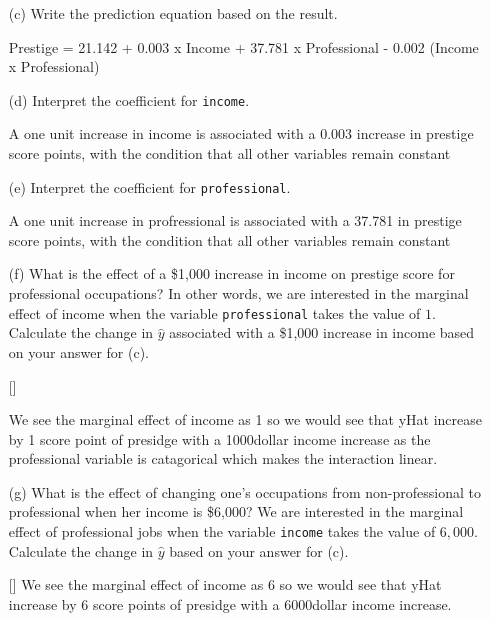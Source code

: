 \documentclass[12pt,letterpaper]{article}
\begin{document}
\begin{enumerate}
	
	\item [(c)]
	Write the prediction equation based on the result.
		\vspace{4cm}
		
	Prestige = 21.142 + 0.003 x Income + 37.781 x Professional - 0.002 (Income x Professional)
	
	
\newpage
	\item [(d)]
	Interpret the coefficient for \texttt{income}.

		A one unit increase in income is associated with a 0.003 increase in prestige score points, with the condition that all other variables remain constant
	
	\vspace{10cm}	
	\item [(e)]
	Interpret the coefficient for \texttt{professional}.

		A one unit increase in profressional is associated with a 37.781 in prestige score points, with the condition that all other variables remain constant
	\newpage
	\item [(f)]
	What is the effect of a \$1,000 increase in income on prestige score for professional occupations? In other words, we are interested in the marginal effect of income when the variable \texttt{professional} takes the value of $1$. Calculate the change in $\hat{y}$ associated with a \$1,000 increase in income based on your answer for (c).
	
	\vspace{3cm}
		[]
	
		We see the marginal effect of income as 1 so we would see that yHat increase by 1 score point of presidge with a 1000dollar income increase as the professional variable is catagorical which makes the interaction linear.
		
		\vspace{3cm}
	\item [(g)]
	What is the effect of changing one's occupations from non-professional to professional when her income is \$6,000? We are interested in the marginal effect of professional jobs when the variable \texttt{income} takes the value of $6,000$. Calculate the change in $\hat{y}$ based on your answer for (c).
	
		[]
	We see the marginal effect of income as 6 so we would see that yHat increase by 6 score points of presidge with a 6000dollar income increase.
\end{enumerate}
\end{document}
